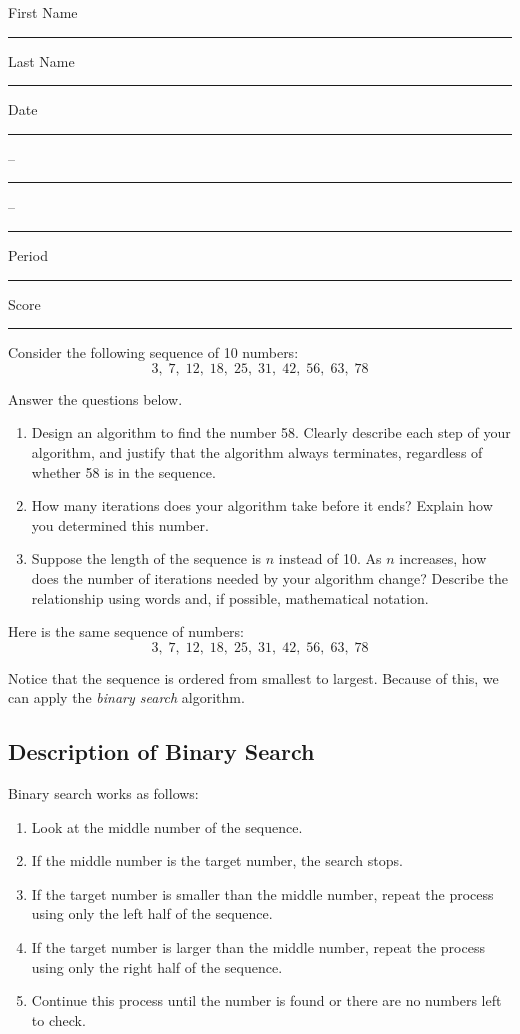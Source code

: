 \documentclass[twoside, 10pt]{article}
\title{}
\date{}
\newcommand{\template}{
\directlua{tex.print(utils.genVersion())}
\noindent
{\large
First Name \rule{6em}{.1pt}\hspace{\stretch{1}} Last Name \rule{6em}{.1pt}\hspace{\stretch{1}} Date \rule{1.5em}{.1pt} -- \rule{1.5em}{.1pt} -- \rule{1.5em}{.1pt}\hspace{\stretch{1}} Period \rule{2em}{.1pt}\hspace{\stretch{1}} Score \rule{2em}{.1pt}
}
\vspace{1em}
}
\begin{document}
\template

Consider the following sequence of 10 numbers:
\[
3,\; 7,\; 12,\; 18,\; 25,\; 31,\; 42,\; 56,\; 63,\; 78
\]

Answer the questions below.

\begin{enumerate}[label=\arabic*.]
    \item Design an algorithm to find the number 58. Clearly describe each step of your algorithm, and justify that the algorithm always terminates, regardless of whether 58 is in the sequence.
    \item How many iterations does your algorithm take before it ends?  
    Explain how you determined this number.
    \item Suppose the length of the sequence is \(n\) instead of 10.  
    As \(n\) increases, how does the number of iterations needed by your algorithm change?  
    Describe the relationship using words and, if possible, mathematical notation.
\end{enumerate}
\clearpage
Here is the same sequence of numbers:
\[
3,\; 7,\; 12,\; 18,\; 25,\; 31,\; 42,\; 56,\; 63,\; 78
\]

Notice that the sequence is ordered from smallest to largest. Because of this, we can apply the \emph{binary search} algorithm.

\subsection*{Description of Binary Search}

Binary search works as follows:
\begin{enumerate}[label = (\roman*)]
    \item Look at the middle number of the sequence.
    \item If the middle number is the target number, the search stops.
    \item If the target number is smaller than the middle number, repeat the process using only the left half of the sequence.
    \item If the target number is larger than the middle number, repeat the process using only the right half of the sequence.
    \item Continue this process until the number is found or there are no numbers left to check.
\end{enumerate}
\end{document}
